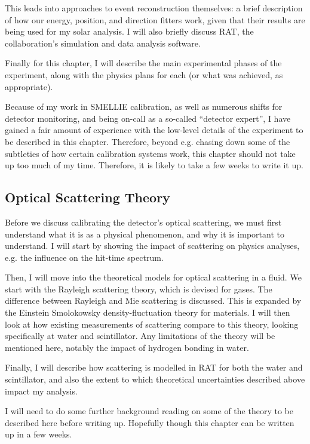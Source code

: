 This leads into approaches to event reconstruction themselves: a brief description of how our energy, position, and direction fitters work, given that their results are being used for my solar analysis. I will also briefly discuss RAT, the collaboration's simulation and data analysis software.

Finally for this chapter, I will describe the main experimental phases of the experiment, along with the physics plans for each (or what was achieved, as appropriate).

Because of my work in SMELLIE calibration, as well as numerous shifts for detector monitoring, and being on-call as a so-called ``detector expert'', I have gained a fair amount of experience with the low-level details of the experiment to be described in this chapter. Therefore, beyond e.g. chasing down some of the subtleties of how certain calibration systems work, this chapter should not take up too much of my time. Therefore, it is likely to take a few weeks to write it up.

\subsection{Optical Scattering Theory}
Before we discuss calibrating the detector's optical scattering, we must first understand what it is as a physical phenomenon, and why it is important to understand. I will start by showing the impact of scattering on physics analyses, e.g. the influence on the hit-time spectrum.

Then, I will move into the theoretical models for optical scattering in a fluid. We start with the Rayleigh scattering theory, which is devised for gases. The difference between Rayleigh and Mie scattering is discussed. This is expanded by the Einstein Smolokowsky density-fluctuation theory for materials. I will then look at how existing measurements of scattering compare to this theory, looking specifically at water and scintillator. Any limitations of the theory will be mentioned here, notably the impact of hydrogen bonding in water.

Finally, I will describe how scattering is modelled in RAT for both the water and scintillator, and also the extent to which theoretical uncertainties described above impact my analysis.

I will need to do some further background reading on some of the theory to be described here before writing up. Hopefully though this chapter can be written up in a few weeks.

